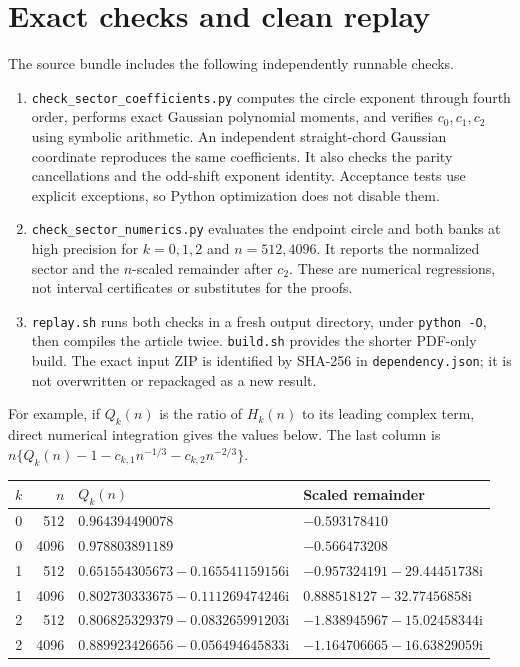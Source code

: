 \documentclass[11pt]{article}
\theoremstyle{remark}\newtheorem{remark}[theorem]{Remark}
\newcommand{\ii}{\mathrm i}
\begin{document}
\section{Exact checks and clean replay}\label{vav:hk:sec:checks}
The source bundle includes the following independently runnable checks.
\begin{enumerate}
 \item \texttt{check\_sector\_coefficients.py} computes the circle exponent through fourth order, performs exact Gaussian polynomial moments, and verifies $c_0,c_1,c_2$ using symbolic arithmetic. An independent straight-chord Gaussian coordinate reproduces the same coefficients. It also checks the parity cancellations and the odd-shift exponent identity. Acceptance tests use explicit exceptions, so Python optimization does not disable them.
 \item \texttt{check\_sector\_numerics.py} evaluates the endpoint circle and both banks at high precision for $k=0,1,2$ and $n=512,4096$. It reports the normalized sector and the $n$-scaled remainder after $c_2$. These are numerical regressions, not interval certificates or substitutes for the proofs.
 \item \texttt{replay.sh} runs both checks in a fresh output directory, under \texttt{python -O}, then compiles the article twice. \texttt{build.sh} provides the shorter PDF-only build. The exact input ZIP is identified by SHA-256 in \texttt{dependency.json}; it is not overwritten or repackaged as a new result.
\end{enumerate}
For example, if $Q_k(n)$ is the ratio of $H_k(n)$ to its leading complex term, direct numerical integration gives the values below. The last column is
$n\{Q_k(n)-1-c_{k,1}n^{-1/3}-c_{k,2}n^{-2/3}\}$.
\begin{center}\small
\begin{tabular}{rrll}
\toprule
$k$ & $n$ & $Q_k(n)$ & Scaled remainder\\
\midrule
0&512&$0.964394490078$&$-0.593178410$\\
0&4096&$0.978803891189$&$-0.566473208$\\
1&512&$0.651554305673-0.165541159156\ii$&$-0.957324191-29.44451738\ii$\\
1&4096&$0.802730333675-0.111269474246\ii$&$0.888518127-32.77456858\ii$\\
2&512&$0.806825329379-0.083265991203\ii$&$-1.838945967-15.02458344\ii$\\
2&4096&$0.889923426656-0.056494645833\ii$&$-1.164706665-16.63829059\ii$\\
\bottomrule
\end{tabular}
\end{center}
\end{document}
